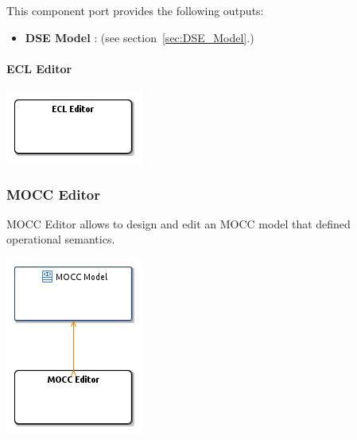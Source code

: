 \documentclass{gemoc} %
\begin{document}
This component port provides the following outputs:
\begin{itemize}
  \item \textbf{DSE Model} :
(see section~\ref{sec:DSE_Model}.)
\end{itemize}

\paragraph{ECL Editor}
\label{sec:ECL_Editor}


\begin{center}
\includegraphics*[trim=0.0cm 0.0cm 0cm 0.0cm, clip=true]{../images/generated/Generated_ECL_Editor.png}
\end{center}





\subsubsection{MOCC Editor}
\label{sec:MOCC_Editor}
MOCC Editor allows to design and edit an MOCC model that defined operational semantics.
\begin{center}
\includegraphics*[trim=0.0cm 0.0cm 0cm 0.0cm, clip=true]{../images/generated/Generated_MOCC_Editor.png}
\end{center}
\end{document}

